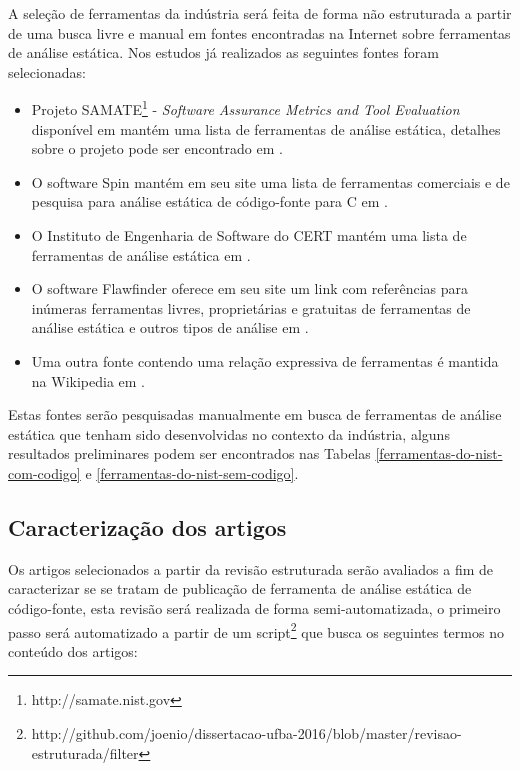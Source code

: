 \documentclass[qual, classic, a4paper]{ufbathesis}
\begin{document}
A seleção de ferramentas da indústria será feita de forma não estruturada a
partir de uma busca livre e manual em fontes encontradas na Internet sobre
ferramentas de análise estática. Nos estudos já realizados as seguintes fontes
foram selecionadas:

\begin{itemize}

  \item Projeto SAMATE\footnote{http://samate.nist.gov} - {\em Software
    Assurance Metrics and Tool Evaluation} disponível em
     mantém uma lista de ferramentas de análise
    estática, detalhes sobre o projeto pode ser encontrado em
    .

  \item O software Spin mantém em seu site uma lista de ferramentas comerciais
    e de pesquisa para análise estática de código-fonte para C em
    .
    
  \item O Instituto de Engenharia de Software do CERT mantém uma lista de
    ferramentas de análise estática em .
    
  \item O software Flawfinder oferece em seu site um link com referências para
    inúmeras ferramentas livres, proprietárias e gratuitas de ferramentas de
    análise estática e outros tipos de análise em
    .

  \item Uma outra fonte contendo uma relação expressiva de ferramentas é
    mantida na Wikipedia em .

\end{itemize}

Estas fontes serão pesquisadas manualmente em busca de ferramentas de análise
estática que tenham sido desenvolvidas no contexto da indústria, alguns
resultados preliminares podem ser encontrados nas Tabelas
\ref{ferramentas-do-nist-com-codigo} e \ref{ferramentas-do-nist-sem-codigo}.

\subsection{Caracterização dos artigos}

Os artigos selecionados a partir da revisão estruturada serão avaliados a fim
de caracterizar se se tratam de publicação de ferramenta de análise estática
de código-fonte, esta revisão será realizada de forma semi-automatizada, o
primeiro passo será automatizado a partir de um
script\footnote{http://github.com/joenio/dissertacao-ufba-2016/blob/master/revisao-estruturada/filter}
que busca os seguintes termos no conteúdo dos artigos:
\end{document}
